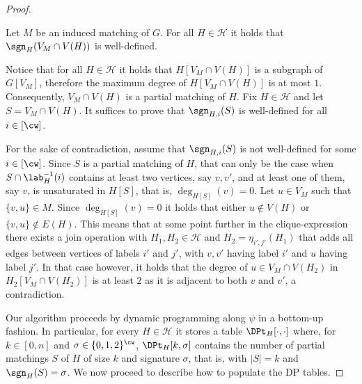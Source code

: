 \begin{proof}
    \begin{claim}\label{claim:induced:cw:well_defined}
        Let $M$ be an induced matching of $G$.
        For all $H \in \mathcal{H}$ it holds that $\sgn_H (V_M \cap V(H))$ is well-defined.
    \end{claim}

    \begin{claimproof} %
        Notice that for all $H \in \mathcal{H}$ it holds that $H[V_M \cap V(H)]$ is a subgraph of $G[V_M]$,
        therefore the maximum degree of $H[V_M \cap V(H)]$ is at most $1$.
        Consequently, $V_M \cap V(H)$ is a partial matching of $H$.
        Fix $H \in \mathcal{H}$ and let $S = V_M \cap V(H)$.
        It suffices to prove that $\sgn_{H,i}(S)$ is well-defined for all $i \in [\cw]$.

        For the sake of contradiction, assume that $\sgn_{H,i}(S)$ is not well-defined for some $i \in [\cw]$.
        Since $S$ is a partial matching of $H$, that can only be the case when $S \cap \lab^{-1}_{H}(i)$ contains at least two vertices,
        say $v,v'$, and at least one of them, say $v$, is unsaturated in $H[S]$,
        that is, $\deg_{H[S]}(v) = 0$.
        Let $u \in V_M$ such that $\{v,u\} \in M$.
        Since $\deg_{H[S]}(v) = 0$ it holds that either $u \notin V(H)$ or $\{v,u\} \notin E(H)$.
        This means that at some point further in the clique-expression there exists a join operation with
        $H_1,H_2 \in \mathcal{H}$ and $H_2 = \eta_{i',j'}(H_1)$ that adds all edges between vertices of labels $i'$ and $j'$,
        with $v,v'$ having label $i'$ and $u$ having label $j'$.
        In that case however, it holds that the degree of $u \in V_M \cap V(H_2)$ in $H_2[V_M \cap V(H_2)]$
        is at least $2$ as it is adjacent to both $v$ and $v'$, a contradiction.
    \end{claimproof}

    Our algorithm proceeds by dynamic programming along $\psi$ in a bottom-up fashion.
    In particular, for every $H \in \mathcal{H}$ it stores a table $\DPt_H[\cdot,\cdot]$ where,
    for $k \in [0,n]$ and $\sigma \in \{0,1,2\}^{\cw}$, $\DPt_H[k,\sigma]$ contains
    the number of partial matchings $S$ of $H$ of size $k$ and signature $\sigma$,
    that is, with $|S|=k$ and $\sgn_H(S) = \sigma$.
    We now proceed to describe how to populate the DP tables.


\end{proof}
